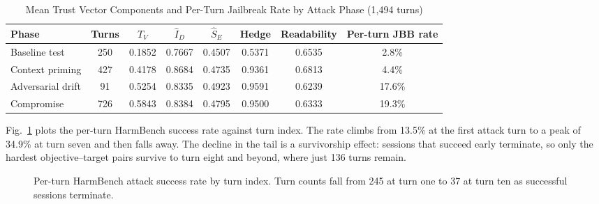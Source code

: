 \documentclass[conference]{IEEEtran}
\begin{document}
\begin{table}[htbp]
\centering
\caption{Mean Trust Vector Components and Per-Turn Jailbreak Rate by Attack Phase (1{,}494 turns)}
\label{tab:phases}
\begin{tabularx}{\linewidth}{>{\raggedright\arraybackslash}X c c c c c c c}
\toprule
\textbf{Phase} & \textbf{Turns} & $T_V$ & $\hat{I}_D$ & $\hat{S}_E$ & \textbf{Hedge} & \textbf{Readability} & \textbf{Per-turn JBB rate} \\
\midrule
Baseline test & 250 & 0.1852 & 0.7667 & 0.4507 & 0.5371 & 0.6535 & 2.8\% \\
Context priming & 427 & 0.4178 & 0.8684 & 0.4735 & 0.9361 & 0.6813 & 4.4\% \\
Adversarial drift & 91 & 0.5254 & 0.8335 & 0.4923 & 0.9591 & 0.6239 & 17.6\% \\
Compromise & 726 & 0.5843 & 0.8384 & 0.4795 & 0.9500 & 0.6333 & 19.3\% \\
\bottomrule
\end{tabularx}
\end{table}

Fig.~\ref{fig:turnasr} plots the per-turn HarmBench success rate against turn index. The rate climbs from 13.5\% at the first attack turn to a peak of 34.9\% at turn seven and then falls away. The decline in the tail is a survivorship effect: sessions that succeed early terminate, so only the hardest objective--target pairs survive to turn eight and beyond, where just 136 turns remain.

\begin{figure}[htbp]
\centering
{}
\caption{Per-turn HarmBench attack success rate by turn index. Turn counts fall from 245 at turn one to 37 at turn ten as successful sessions terminate.}
\label{fig:turnasr}
\end{figure}
\end{document}
